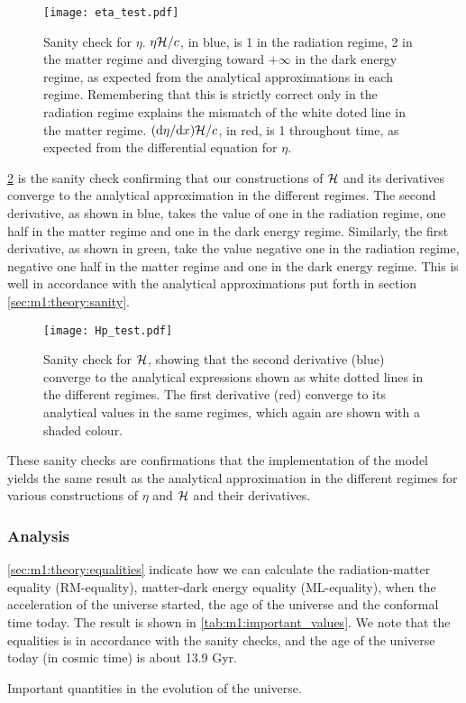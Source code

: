     \begin{figure}
        \texttt{[image: eta\_test.pdf]}
        \caption{Sanity check for $\eta$. $\eta\mathcal{H}/c$, in blue, is 1 in the radiation regime, 2 in the matter regime and diverging toward $+\infty$ in the dark energy regime, as expected from the analytical approximations in each regime. Remembering that this is strictly correct only in the radiation regime explains the mismatch of the white doted line in the matter regime. $(\mathrm{d} \eta /\mathrm{d} x)\mathcal{H}/c$, in red, is 1 throughout time, as expected from the differential equation for $\eta$.}
        \label{fig:m1:eta_tests}
    \end{figure}

    \cref{fig:m1:Hp_tests} is the sanity check confirming that our constructions of $\mathcal{H}$ and its derivatives converge to the analytical approximation in the different regimes. The second derivative, as shown in blue, takes the value of one in the radiation regime, one half in the matter regime and one in the dark energy regime. Similarly, the first derivative, as shown in green, take the value negative one in the radiation regime, negative one half in the matter regime and one in the dark energy regime. This is well in accordance with the analytical approximations put forth in section \cref{sec:m1:theory:sanity}. 

    \begin{figure}
        \texttt{[image: Hp\_test.pdf]}
        \caption{Sanity check for $\mathcal{H}$, showing that the second derivative (blue) converge to the analytical expressions shown as white dotted lines in the different regimes. The first derivative (red) converge to its analytical values in the same regimes, which again are shown with a shaded colour.}
        \label{fig:m1:Hp_tests}
    \end{figure}

    These sanity checks are confirmations that the implementation of the model yields the same result as the analytical approximation in the different regimes for various constructions of $\eta$ and $\mathcal{H}$ and their derivatives.
    
\subsubsection{Analysis}

    \cref{sec:m1:theory:equalities} indicate how we can calculate the radiation-matter equality (RM-equality), matter-dark energy equality (ML-equality), when the acceleration of the universe started, the age of the universe and the conformal time today. The result is shown in \cref{tab:m1:important_values}. We note that the equalities is in accordance with the sanity checks, and the age of the universe today (in cosmic time) is about 13.9 Gyr. 
    \begin{table}
        
        \caption{Important quantities in the evolution of the universe.}
        \label{tab:m1:important_values}
    \end{table}


